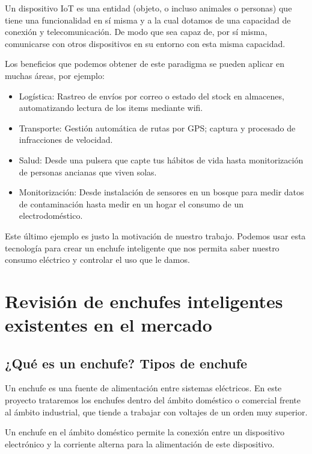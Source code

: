 \documentclass[a4paper,10pt]{article}
\begin{document}
Un dispositivo IoT es una entidad (objeto, o incluso animales o
personas) que tiene una funcionalidad en sí misma y a la cual dotamos de
una capacidad de conexión y telecomunicación. De modo que sea capaz de,
por sí misma, comunicarse con otros dispositivos en su entorno con esta
misma capacidad.

Los beneficios que podemos obtener de este paradigma se pueden aplicar
en muchas áreas, por
ejemplo\cite{vongsingthongs.;smanchats.IoTExamplesSuranaree}:

\begin{itemize}
\item
  Logística: Rastreo de envíos por correo o estado del stock en
  almacenes, automatizando lectura de los items mediante wifi.
\item
  Transporte: Gestión automática de rutas por GPS; captura y procesado
  de infracciones de velocidad.
\item
  Salud: Desde una pulsera que capte tus hábitos de vida hasta
  monitorización de personas ancianas que viven solas.
\item
  Monitorización: Desde instalación de sensores en un bosque para medir
  datos de contaminación hasta medir en un hogar el consumo de un
  electrodoméstico.
\end{itemize}

Este último ejemplo es justo la motivación de nuestro trabajo. Podemos
usar esta tecnología para crear un enchufe inteligente que nos permita
saber nuestro consumo eléctrico y controlar el uso que le damos.

\newpage

\section{Revisión de enchufes inteligentes existentes en el
mercado}\label{revisiuxf3n-de-enchufes-inteligentes-existentes-en-el-mercado}

\subsection{¿Qué es un enchufe? Tipos de
enchufe}\label{quuxe9-es-un-enchufe-tipos-de-enchufe}

Un enchufe es una fuente de alimentación entre sistemas eléctricos. En
este proyecto trataremos los enchufes dentro del ámbito doméstico o
comercial frente al ámbito industrial, que tiende a trabajar con
voltajes de un orden muy superior.

Un enchufe en el ámbito doméstico permite la conexión entre un
dispositivo electrónico y la corriente alterna para la alimentación de
este dispositivo.
\end{document}
